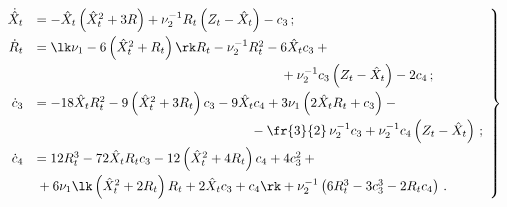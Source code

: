 \begin{equation}

\left.

\begin{array}{rl}

\dot{\hat X}_t &=-\hat X_t \left(\hat X_t^2 + 3 R\right) + \nu_2^{-1} R_t 

\left(Z_t - \hat X_t\right) - c_3\,; %

\\[6pt]

\dot R_t &= \lk\nu_1 - 6 \left(\hat X_t^2 + R_t\right)\rk R_t - \nu_2^{-1} R_t^2 - 

6 \hat X_t c_3 +{}\\[6pt]

&\hspace*{65mm}{}+ \nu_2^{-1} c_3 \left(Z_t - \hat X_t\right)-2 c_4\,; %

\\[6pt]

\dot c_3 &= -18 \hat X_t R_t^2 - 9 \left(\hat X_t^2 + 3 R_t\right) c_3-9 

\hat X_t c_4+ 3 \nu_1 \left( 2 \hat X_t R_t + c_3\right) -{}\\[6pt]

&\displaystyle\hspace*{57mm}{}- \fr{3}{2}\,

 \nu_2^{-1} c_3+\nu_2^{-1} c_4 \left(Z_t - \hat X_t\right)\,; %

 \\[6pt]

 \dot c_4 &= 12 R_t^3 - 72 \hat X_t R_t c_3 - 12 \left(\hat X_t^2 + 4 R_t\right) c_4 + 

4 c_3^2 +{}\\[6pt]

&{}+ 6 \nu_1 \lk \left(\hat X_t^2 + 2 R_t\right) R_t + 2 \hat X_t c_3 + c_4\rk +

 \nu_2^{-1} \left( 6 R_t^3 - 3 c_3^3 - 2 R_t c_4\right)\,. %

 \end{array}

 \right\}

 \label{e7.7-s1}

 \end{equation}

 


 


